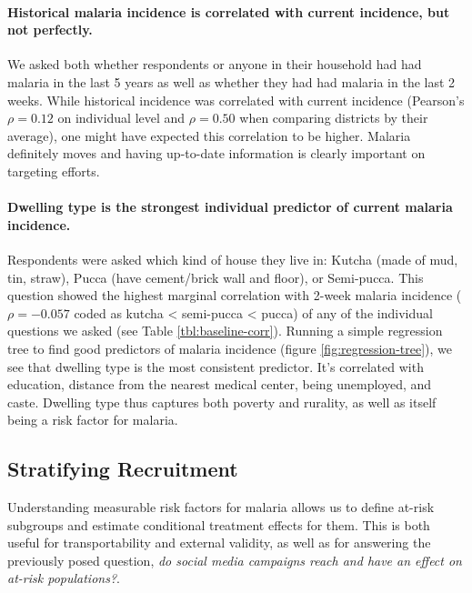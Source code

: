 \documentclass[a4paper,12pt]{article}
\theoremstyle{proposition}
\begin{document}
\paragraph{Historical malaria incidence is correlated with current incidence, but not perfectly.} We asked both whether respondents or anyone in their household had had malaria in the last 5 years as well as whether they had had malaria in the last 2 weeks. While historical incidence was correlated with current incidence (Pearson's $\rho = 0.12$ on individual level and $\rho = 0.50$ when comparing districts by their average), one might have expected this correlation to be higher. Malaria definitely moves and having up-to-date information is clearly important on targeting efforts.


\paragraph{Dwelling type is the strongest individual predictor of current malaria incidence.} Respondents were asked which kind of house they live in: Kutcha (made of mud, tin, straw), Pucca (have cement/brick wall and floor), or Semi-pucca. This question showed the highest marginal correlation with 2-week malaria incidence ($\rho = -0.057$ coded as kutcha < semi-pucca < pucca) of any of the individual questions we asked (see Table \ref{tbl:baseline-corr}). Running a simple regression tree to find  good predictors of malaria incidence (figure \ref{fig:regression-tree}), we see that dwelling type is the most consistent predictor. It's correlated with education, distance from the nearest medical center, being unemployed, and caste. Dwelling type thus captures both poverty and rurality, as well as itself being a risk factor for malaria.






\subsection{Stratifying Recruitment}

Understanding measurable risk factors for malaria allows us to define at-risk subgroups and estimate conditional treatment effects for them. This is both useful for transportability and external validity, as well as for answering the previously posed question, \textit{do social media campaigns reach and have an effect on at-risk populations?}.
\end{document}
